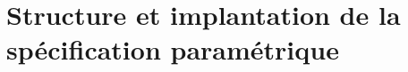 
\section[Structure et implantation de la spécification paramétrique]{Structure et implantation de la spécification paramétrique}
\label{sec:implantation-specification-parametrique}

